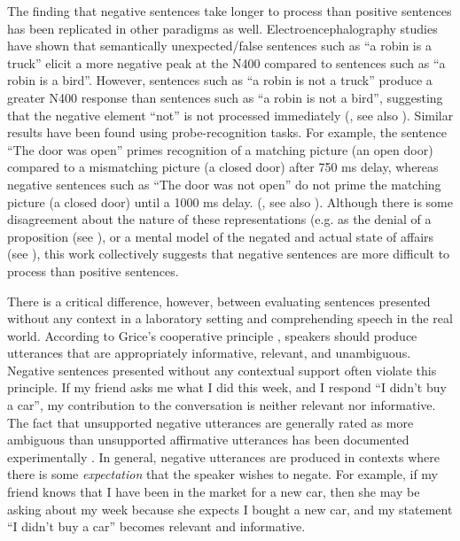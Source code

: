 \documentclass[10pt,letterpaper]{article}
\begin{document}
The finding that negative sentences take longer to process than positive sentences has been replicated in other paradigms as well.  Electroencephalography studies have shown that semantically unexpected/false sentences such as ``a robin is a truck'' elicit a more negative peak at the N400 compared to sentences such as ``a robin is a bird''.  However, sentences such as ``a robin is not a truck'' produce a greater N400 response than sentences such as ``a robin is not a bird'', suggesting that the negative element ``not'' is not processed immediately (, see also ).  Similar results have been found using probe-recognition tasks.  For example, the sentence ``The door was open'' primes recognition of  a matching picture (an open door) compared to a mismatching picture (a closed door) after 750 ms delay, whereas negative sentences such as ``The door was not open'' do not prime the matching picture (a closed door) until a 1000 ms delay.  (, see also ).  Although there is some disagreement about the nature of these representations (e.g. as the denial of a proposition (see ), or a mental model of the negated and actual state of affairs (see ), this work collectively suggests that negative sentences are more difficult to process than positive sentences.  
  
There is a critical difference, however, between evaluating sentences presented without any context in a laboratory setting and comprehending speech in the real world. According to Grice's cooperative principle \cite{grice1975}, speakers should produce utterances that are appropriately informative, relevant, and unambiguous.  Negative sentences presented without any contextual support often violate this principle.  If my friend asks me what I did this week, and I respond ``I didn't buy a car'', my contribution to the conversation is neither relevant nor informative.  The fact that unsupported negative utterances are generally rated as more ambiguous than unsupported affirmative utterances has been documented experimentally \cite{glenberg1999}.  In general, negative utterances are produced in contexts where there is some \emph{expectation} that the speaker wishes to negate.  For example, if my friend knows that I have been in the market for a new car, then she may be asking about my week because she expects I bought a new car, and my statement ``I didn't buy a car'' becomes relevant and informative.  
\end{document}

